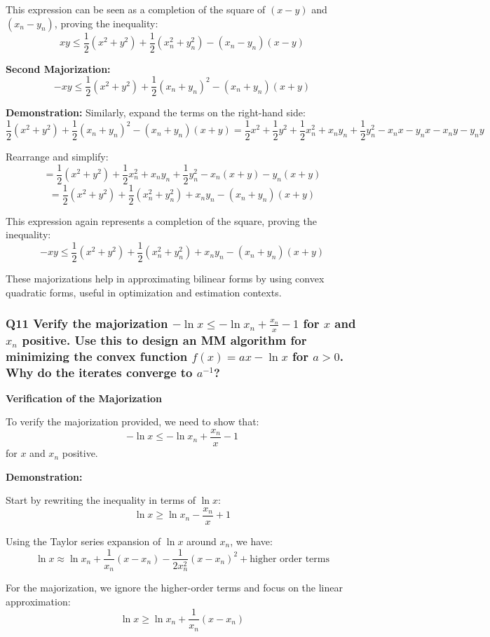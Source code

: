 \documentclass[8pt]{article}
\begin{document}
This expression can be seen as a completion of the square of \( (x - y) \) and \( (x_n - y_n) \), proving the inequality:
\[
xy \leq \frac{1}{2} (x^2 + y^2) + \frac{1}{2} (x_n^2 + y_n^2) - (x_n - y_n)(x - y)
\]

\textbf{Second Majorization:}
\[
-xy \leq \frac{1}{2} (x^2 + y^2) + \frac{1}{2} (x_n + y_n)^2 - (x_n + y_n)(x + y)
\]

\textbf{Demonstration:}
Similarly, expand the terms on the right-hand side:
\[
\frac{1}{2} (x^2 + y^2) + \frac{1}{2} (x_n + y_n)^2 - (x_n + y_n)(x + y) = \frac{1}{2} x^2 + \frac{1}{2} y^2 + \frac{1}{2} x_n^2 + x_ny_n + \frac{1}{2} y_n^2 - x_nx - y_nx - x_ny - y_ny
\]

Rearrange and simplify:
\[
= \frac{1}{2} (x^2 + y^2) + \frac{1}{2} x_n^2 + x_ny_n + \frac{1}{2} y_n^2 - x_n(x + y) - y_n(x + y)
\]
\[
= \frac{1}{2} (x^2 + y^2) + \frac{1}{2} (x_n^2 + y_n^2) + x_ny_n - (x_n + y_n)(x + y)
\]

This expression again represents a completion of the square, proving the inequality:
\[
-xy \leq \frac{1}{2} (x^2 + y^2) + \frac{1}{2} (x_n^2 + y_n^2) + x_ny_n - (x_n + y_n)(x + y)
\]

These majorizations help in approximating bilinear forms by using convex quadratic forms, useful in optimization and estimation contexts.

\subsubsection*{Q11 Verify the majorization \(- \ln x \leq - \ln x_n + \frac{x_n}{x} - 1\) for \(x\) and \(x_n\) positive. Use this to design an MM algorithm for minimizing the convex function \(f(x) = ax - \ln x\) for \(a > 0\). Why do the iterates converge to \(a^{-1}\)?}

\textbf{Verification of the Majorization}

To verify the majorization provided, we need to show that:
\[
- \ln x \leq - \ln x_n + \frac{x_n}{x} - 1
\]
for \(x\) and \(x_n\) positive.

\textbf{Demonstration:}

Start by rewriting the inequality in terms of \( \ln x \):
\[
\ln x \geq \ln x_n - \frac{x_n}{x} + 1
\]

Using the Taylor series expansion of \( \ln x \) around \( x_n \), we have:
\[
\ln x \approx \ln x_n + \frac{1}{x_n}(x - x_n) - \frac{1}{2x_n^2}(x - x_n)^2 + \text{higher order terms}
\]

For the majorization, we ignore the higher-order terms and focus on the linear approximation:
\[
\ln x \geq \ln x_n + \frac{1}{x_n}(x - x_n)
\]
\end{document}
